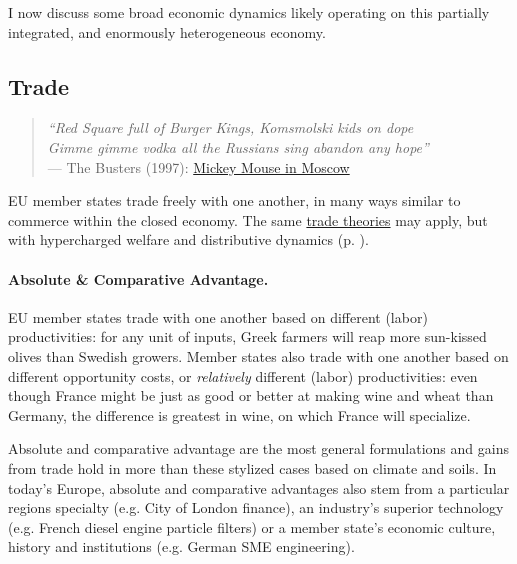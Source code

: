 \documentclass[11pt,a4paper,oneside,openright]{article}
\begin{document}

I now discuss some broad economic dynamics likely operating on this partially integrated, and enormously heterogeneous economy. 



\subsection[Trade]{Trade}

\begin{verse}
	\emph{``Red Square full of Burger Kings, Komsmolski kids on dope \\ 
	Gimme gimme vodka all the Russians sing abandon any hope''\\}
	--- The Busters (1997): \href{http://www.youtube.com/watch?v=xsxRMOnpMTY}{Mickey Mouse in Moscow}\\
\end{verse}

\gls{EU} member states trade freely with one another, in many ways similar to commerce within the closed economy. The same \hyperref[sec:space]{trade theories} may apply, but with hypercharged welfare and distributive dynamics (p. \pageref{sec:space}). 
		
\paragraph{Absolute \& Comparative Advantage.} \gls{EU} member states trade with one another based on different (labor) productivities: for any unit of inputs, Greek farmers will reap more sun-kissed olives than Swedish growers. Member states also trade with one another based on different opportunity costs, or \emph{relatively} different (labor) productivities: even though France might be just as good or better at making wine and wheat than Germany, the difference is greatest in wine, on which France will specialize. 

Absolute and comparative advantage are the most general formulations and gains from trade hold in more than these stylized cases based on climate and soils. In today's Europe, absolute and comparative advantages also stem from a particular regions specialty (e.g. City of London finance), an industry's superior technology (e.g. French diesel engine particle filters) or a member state's economic culture, history and institutions (e.g. German \gls{SME} engineering).
\end{document}
